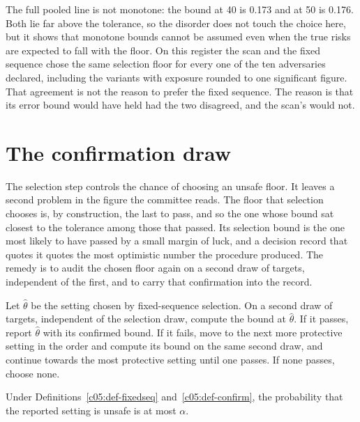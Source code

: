 \syntheticnote


The full pooled line is not monotone: the bound at 40 is 0.173 and at 50 is 0.176.
Both lie far above the tolerance, so the disorder does not touch the choice here, but it
shows that monotone bounds cannot be assumed even when the true risks are expected to
fall with the floor. On this register the scan and the fixed sequence chose the same
selection floor for every one of the ten adversaries declared, including the variants
with exposure rounded to one significant figure.
That agreement is not the reason to prefer the fixed sequence. The reason is that its
error bound would have held had the two disagreed, and the scan's would not.

\section{The confirmation draw}

The selection step controls the chance of choosing an unsafe floor. It leaves a second
problem in the figure the committee reads. The floor that selection chooses is, by
construction, the last to pass, and so the one whose bound sat closest to the tolerance
among those that passed. Its selection bound is the one most likely to have passed by a
small margin of luck, and a decision record that quotes it quotes the most optimistic
number the procedure produced. The remedy is to audit the chosen floor again on a second
draw of targets, independent of the first, and to carry that confirmation into the
record.

\begin{definition}\label{c05:def-confirm}
Let $\hat\theta$ be the setting chosen by fixed-sequence selection. On a second draw of
targets, independent of the selection draw, compute the bound at $\hat\theta$. If it
passes, report $\hat\theta$ with its confirmed bound. If it fails, move to the next more
protective setting in the order and compute its bound on the same second draw, and
continue towards the most protective setting until one passes. If none passes, choose
none.
\end{definition}

\begin{proposition}\label{c05:prop-confirm}
Under Definitions~\ref{c05:def-fixedseq} and~\ref{c05:def-confirm}, the probability that
the reported setting is unsafe is at most $\alpha$.
\end{proposition}

